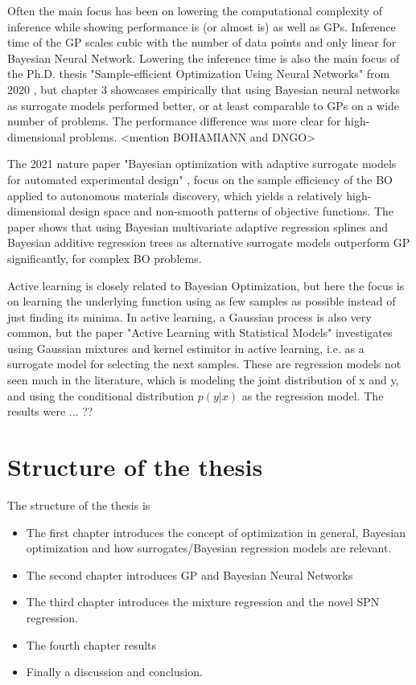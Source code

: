 Often the main focus has been on lowering the computational complexity of inference while
showing performance is (or almost is) as well as GPs. Inference time of the GP scales cubic with the
number of data points and only linear for Bayesian Neural Network. Lowering the inference time is also the
main focus of the Ph.D. thesis "Sample-efficient Optimization Using Neural Networks" from 2020
\cite{PhDthesis}, but chapter 3 showcases empirically that using Bayesian neural networks as
surrogate models performed better, or at least comparable to GPs on a wide number of
problems. The performance difference was more clear for high-dimensional problems. 
<mention BOHAMIANN and DNGO>

The 2021 nature paper "Bayesian optimization with adaptive surrogate models for automated experimental design"
\cite{Nature_BO_paper}, focus on the sample efficiency of the BO applied to autonomous materials discovery, 
which yields a relatively high-dimensional design space and non-smooth patterns of objective functions.  
The paper shows that using Bayesian multivariate adaptive regression splines
and Bayesian additive regression trees as alternative surrogate models outperform GP significantly, 
for complex BO problems. 

Active learning is closely related to Bayesian Optimization, but here the focus is on learning the underlying function
using as few samples as possible instead of just finding its minima. 
In active learning, a Gaussian process is also very common, but the paper "Active Learning with Statistical Models" \cite{ALStatisticalModels}
investigates using Gaussian mixtures and kernel estimitor in active learning, i.e. as a surrogate model for selecting
the next samples. These are regression models not seen much in the literature, which
is modeling the joint distribution of x and y, and using the conditional distribution $p(y|x)$
as the regression model. The results were ... ??

\section{Structure of the thesis}
The structure of the thesis is
\begin{itemize}
    \item The first chapter introduces the concept of optimization in general, Bayesian optimization 
    and how surrogates/Bayesian regression models are relevant.
    \item The second chapter introduces GP and Bayesian Neural Networks
    \item The third chapter introduces the mixture regression and the novel SPN regression.
    \item The fourth chapter results
    \item Finally a discussion and conclusion.
\end{itemize}



